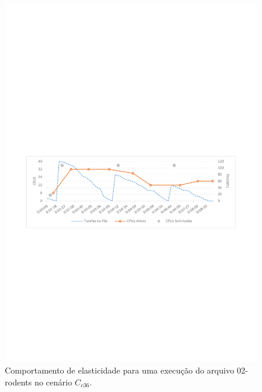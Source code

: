 \documentclass[english,brazilian]{UNISINOSmonografia} %
\begin{document}
\begin{figure}[p]
	\centering%
	\begin{minipage}{\textwidth}
		\caption{Comportamento de elasticidade para uma execução do arquivo 02-rodents no cenário $C_{c36}$.}
		\label{fig:results-modelo-batch-rodents}
		\vspace{1ex}
		\includegraphics[trim=60 325 60 360,clip,width=\textwidth]{2018-12-16T05-17-35_rodents}
	\end{minipage}
\end{figure}
\end{document}

